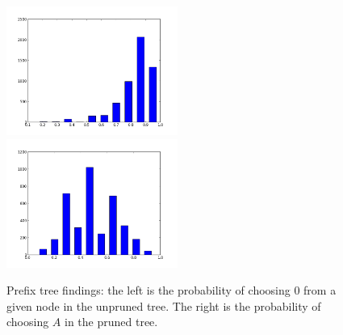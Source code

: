 \begin{figure}[t]
  \includegraphics[width=0.5\textwidth]{figures/tree-prob-all-unfiltered.png}
  \includegraphics[width=0.5\textwidth]{figures/tree-prob-all-filtered.png}
  \caption{Prefix tree findings: the left is the probability of choosing 0 from a given node in the unpruned tree. The right is the probability of choosing $A$ in the pruned tree.}
  \label{prefix-tree-stats}
\end{figure}
